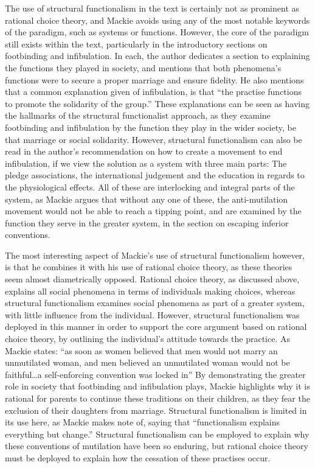 \documentclass[twoside, 11pt]{article}
\begin{document}
	The use of structural functionalism in the text is certainly not as prominent as rational choice theory, and Mackie avoids using any of the most notable keywords of the paradigm, such as systems or functions. However, the core of the paradigm still exists within the text, particularly in the introductory sections on footbinding and infibulation. In each, the author dedicates a section to explaining the functions they played in society, and mentions that both phenomena's functions were to secure a proper marriage and ensure fidelity. \cite[pp.1001-1002, 1004]{Mackie1996} He also mentions that a common explanation given of infibulation, is that ``the practise functions to promote the solidarity of the group.'' \cite[p.1004]{Mackie1996} These explanations can be seen as having the hallmarks of the structural functionalist approach, as they examine footbinding and infibulation by the function they play in the wider society, be that marriage or social solidarity. However, structural functionalism can also be read in the author's recommendation on how to create a movement to end infibulation, if we view the solution as a system with three main parts: The pledge associations, the international judgement and the education in regards to the physiological effects. All of these are interlocking and integral parts of the system, as Mackie argues that without any one of these, the anti-mutilation movement would not be able to reach a tipping point, \cite[p.1012]{Mackie1996} and are examined by the function they serve in the greater system, in the section on escaping inferior conventions.\cite[pp.1011-1014]{Mackie1996}

	The most interesting aspect of Mackie's use of structural functionalism however, is that he combines it with his use of rational choice theory, as these theories seem almost diametrically opposed. Rational choice theory, as discussed above, explains all social phenomena in terms of individuals making choices, whereas structural functionalism examines social phenomena as part of a greater system, with little influence from the individual. However, structural functionalism was deployed in this manner in order to support the core argument based on rational choice theory, by outlining the individual's attitude towards the practice. As Mackie states: ``as soon as women believed that men would not marry an unmutilated woman, and men believed an unmutilated woman would not be faithful\ldots a self-enforcing convention was locked in'' \cite[p.1008]{Mackie1996} By demonstrating the greater role in society that footbinding and infibulation plays, Mackie highlights why it is rational for parents to continue these traditions on their children, as they fear the exclusion of their daughters from marriage. Structural functionalism is limited in its  use here, as Mackie makes note of, saying that ``functionalism explains everything but change.'' \cite[p.1010]{Mackie1996} Structural functionalism can be employed to explain why these conventions of mutilation have been so enduring, but rational choice theory must be deployed to explain how the cessation of these practises occur. 
\end{document}
